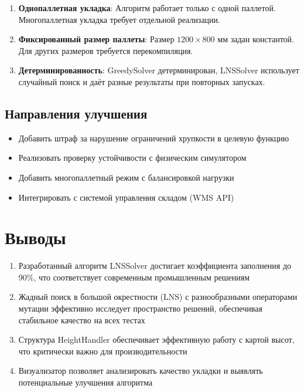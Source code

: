 \begin{enumerate}
    \item \textbf{Однопаллетная укладка}: Алгоритм работает только с одной паллетой. Многопаллетная укладка требует отдельной реализации.
    
    \item \textbf{Фиксированный размер паллеты}: Размер $1200 \times 800$ мм задан константой. Для других размеров требуется перекомпиляция.
    
    \item \textbf{Детерминированность}: GreedySolver детерминирован, LNSSolver использует случайный поиск и даёт разные результаты при повторных запусках.
\end{enumerate}

\subsection{Направления улучшения}

\begin{itemize}
    \item Добавить штраф за нарушение ограничений хрупкости в целевую функцию
    \item Реализовать проверку устойчивости с физическим симулятором
    \item Добавить многопаллетный режим с балансировкой нагрузки
    \item Интегрировать с системой управления складом (WMS API)
\end{itemize}

\section{Выводы}

\begin{enumerate}
    \item Разработанный алгоритм LNSSolver достигает коэффициента заполнения до 90\%, что соответствует современным промышленным решениям
    \item Жадный поиск в большой окрестности (LNS) с разнообразными операторами мутации эффективно исследует пространство решений, обеспечивая стабильное качество на всех тестах
    \item Структура HeightHandler обеспечивает эффективную работу с картой высот, что критически важно для производительности
    \item Визуализатор позволяет анализировать качество укладки и выявлять потенциальные улучшения алгоритма
\end{enumerate}
